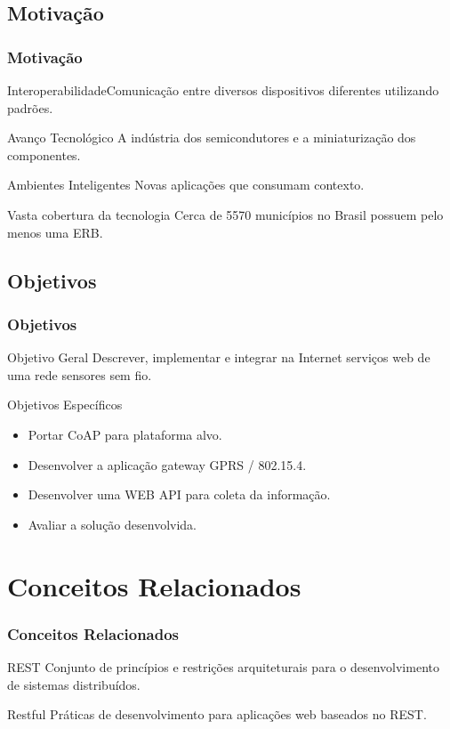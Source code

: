 \documentclass{beamer}
\begin{document}
\subsection{Motivação}
\begin{frame}
\frametitle{Motivação}
\begin{block}{Interoperabilidade}Comunicação entre diversos dispositivos diferentes utilizando padrões.
\end{block}
    \begin{block}{Avanço Tecnológico}
        A indústria dos semicondutores e a miniaturização dos componentes.
    \end{block}
    \begin{block}{Ambientes Inteligentes}
        Novas aplicações que consumam contexto.
    \end{block}
\begin{block}{Vasta cobertura da tecnologia}
    Cerca de 5570 municípios no Brasil possuem pelo menos uma ERB.
\end{block}
\end{frame}

\subsection{Objetivos}
\begin{frame}
\frametitle{Objetivos}
\begin{block}{Objetivo Geral}
    Descrever, implementar e integrar na Internet serviços web de uma rede sensores sem fio.
\end{block}
\begin{block}{Objetivos Específicos}
\begin{itemize}
\item Portar CoAP para plataforma alvo.
\item Desenvolver a aplicação gateway GPRS / 802.15.4.
\item Desenvolver uma WEB API para coleta da informação.
\item Avaliar a solução desenvolvida.
\end{itemize}
\end{block}
\end{frame}


\section{Conceitos Relacionados}
\begin{frame}
\frametitle{Conceitos Relacionados}

\begin{block}{REST}
    Conjunto de princípios e restrições arquiteturais para o desenvolvimento de sistemas distribuídos.
\end{block}
\begin{block}{Restful}
    Práticas de desenvolvimento para aplicações web baseados no REST.
\end{block}
\end{frame}
\end{document}
